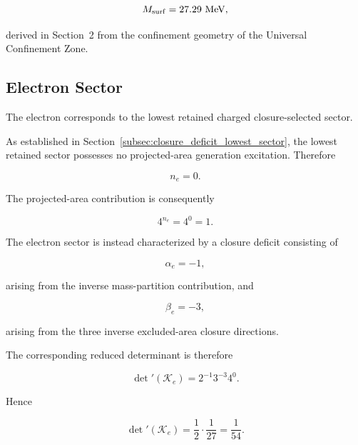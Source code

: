 \documentclass[11pt]{article}
\theoremstyle{definition}
\theoremstyle{remark}
\begin{document}
\begin{equation}
M_{\rm surf} =
27.29~{\rm MeV},
\end{equation}

derived in Section~2 from the confinement geometry of the
Universal Confinement Zone.


\subsection{Electron Sector}
\label{subsec:electron_sector}

The electron corresponds to the lowest retained charged
closure-selected sector.

As established in
Section~\ref{subsec:closure_deficit_lowest_sector},
the lowest retained sector possesses no projected-area
generation excitation. Therefore

\begin{equation}
n_e =
0.
\end{equation}

The projected-area contribution is consequently

\begin{equation}
4^{n_e} = 4^0 =
1.
\end{equation}

The electron sector is instead characterized by a closure
deficit consisting of

\begin{equation}
\alpha_e =
-1,
\end{equation}

arising from the inverse mass-partition contribution, and

\begin{equation}
\beta_e =
-3,
\end{equation}

arising from the three inverse excluded-area closure
directions.

The corresponding reduced determinant is therefore

\begin{equation}
\det{}'(\mathcal K_e) =
2^{-1}
3^{-3}
4^{0}.
\end{equation}

Hence

\begin{equation}
\det{}'(\mathcal K_e) =
\frac{1}{2}
\cdot
\frac{1}{27} =
\frac{1}{54}.
\label{eq:electron_determinant_final}
\end{equation}
\end{document}
